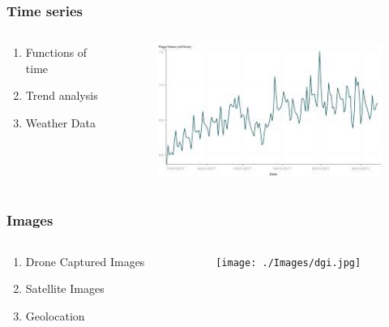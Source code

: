 \documentclass{beamer}
\begin{document}
\begin{frame}
\frametitle{Time series}



\begin{columns}[c] %
\begin{column}{0.5\textwidth}
\begin{enumerate}
\item Functions of time
\item Trend analysis
\item Weather Data
\end{enumerate}
\end{column}
\begin{column}{0.5\textwidth}

\begin{figure}
\includegraphics[scale=0.5]{./Images/time.jpg}
\end{figure}
\end{column}
\end{columns}
\end{frame}


\begin{frame}
\frametitle{Images}



\begin{columns}[c] %
\begin{column}{0.5\textwidth}
\begin{enumerate}
\item Drone Captured Images
\item Satellite Images
\item Geolocation 
\end{enumerate}
\end{column}
\begin{column}{0.5\textwidth}

\begin{figure}
\texttt{[image: ./Images/dgi.jpg]}
\end{figure}
\end{column}
\end{columns}
\end{frame}
\end{document}
